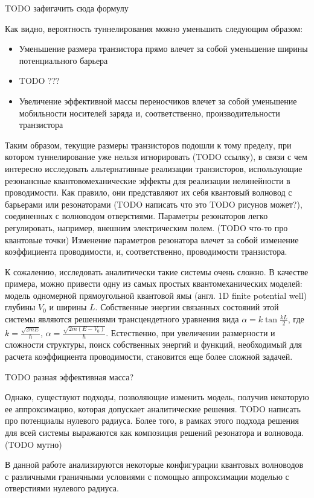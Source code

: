 TODO зафигачить сюда формулу

Как видно, вероятность туннелирования можно уменьшить следующим образом:

\begin{itemize}
\item Уменьшение размера транзистора прямо влечет за собой уменьшение ширины потенциального барьера
\item TODO ???
\item Увеличение эффективной массы переносчиков влечет за собой уменьшение мобильности носителей заряда и, соответственно, производительности транзистора
\end{itemize}

Таким образом, текущие размеры транзисторов подошли к тому пределу, при котором туннелирование уже нельзя игнорировать (TODO ссылку), в связи с чем интересно исследовать альтернативные реализации транзисторов, использующие резонансные квантовомеханические эффекты для реализации нелинейности в проводимости. Как правило, они представляют их себя квантовый волновод с барьерами или резонаторами (TODO написать что это TODO рисунов может?), соединенных с волноводом отверстиями. Параметры резонаторов легко регулировать, например, внешним электрическим полем. (TODO что-то про квантовые точки) Изменение параметров резонатора влечет за собой изменение коэффициента проводимости, и, соответственно, проводимости транзистора.

К сожалению, исследовать аналитически такие системы очень сложно. В качестве примера, можно привести одну из самых простых квантомеханических моделей: модель одномерной прямоугольной квантовой ямы (англ. 1D finite potential well) глубины $V_0$ и ширины $L$. Собственные энергии связанных состояний этой системы являются решениями трансцендетного уравнения вида $\alpha = k \tan \frac{k L}{2}$, где $k = \frac{\sqrt{2 m E}}{\hbar}$, $\alpha = \frac{\sqrt{2 m (E - V_0)}}{\hbar}$. Естественно, при увеличении размерности и сложности структуры, поиск собственных энергий и функций, необходимый для расчета коэффициента проводимости, становится еще более сложной задачей.

TODO разная эффективная масса?

Однако, существуют подходы, позволяющие изменить модель, получив некоторую ее аппроксимацию, которая допускает аналитические решения. TODO написать про потенциалы нулевого радиуса. Более того, в рамках этого подхода решения для всей системы выражаются как композиция решений резонатора и волновода. (TODO мутно)

В данной работе анализируются некоторые конфигурации квантовых волноводов с различными граничными условиями с помощью аппроксимации моделью с отверстиями нулевого радиуса.
